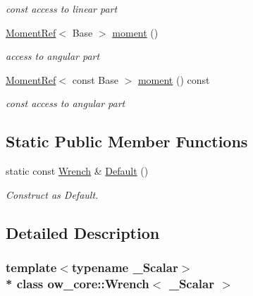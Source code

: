 \begin{DoxyCompactItemize}
\begin{DoxyCompactList}\small\item\em const access to linear part \end{DoxyCompactList}\item 
\hyperlink{classow__core_1_1MomentRef}{Moment\+Ref}$<$ Base $>$ \hyperlink{classow__core_1_1Wrench_a8ce23dd81a3aaffc0298531f785647de}{moment} ()\hypertarget{classow__core_1_1Wrench_a8ce23dd81a3aaffc0298531f785647de}{}\label{classow__core_1_1Wrench_a8ce23dd81a3aaffc0298531f785647de}

\begin{DoxyCompactList}\small\item\em access to angular part \end{DoxyCompactList}\item 
\hyperlink{classow__core_1_1MomentRef}{Moment\+Ref}$<$ const Base $>$ \hyperlink{classow__core_1_1Wrench_a2cddfa50e6078ff59f3bbcbb36bace2d}{moment} () const \hypertarget{classow__core_1_1Wrench_a2cddfa50e6078ff59f3bbcbb36bace2d}{}\label{classow__core_1_1Wrench_a2cddfa50e6078ff59f3bbcbb36bace2d}

\begin{DoxyCompactList}\small\item\em const access to angular part \end{DoxyCompactList}\end{DoxyCompactItemize}
\subsection*{Static Public Member Functions}
\begin{DoxyCompactItemize}
\item 
static const \hyperlink{classow__core_1_1Wrench}{Wrench} \& \hyperlink{classow__core_1_1Wrench_a3dc8f10073ab93f15eb839b2a0fef07e}{Default} ()
\begin{DoxyCompactList}\small\item\em Construct as Default. \end{DoxyCompactList}\end{DoxyCompactItemize}


\subsection{Detailed Description}
\subsubsection*{template$<$typename \+\_\+\+Scalar$>$\\*
class ow\+\_\+core\+::\+Wrench$<$ \+\_\+\+Scalar $>$}

